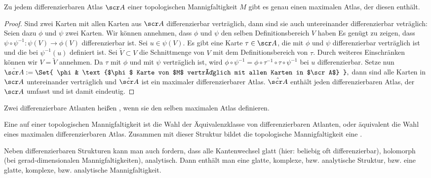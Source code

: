 \begin{st} \label{1.7}
    Zu jedem differenzierbaren Atlas $\scr A$ einer topologischen Mannigfaltigkeit $M$ gibt es genau einen maximalen Atlas, der diesen enthält.
    \begin{proof}
        Sind zwei Karten mit allen Karten aus $\scr A$ differenzierbar verträglich, dann sind sie auch untereinander differenzierbar veträglich:
        Seien dazu $\phi$ und $\psi$ zwei Karten.
        Wir können annehmen, dass $\phi$ und $\psi$ den selben Definitionsbereich $V$ haben
        Es genügt zu zeigen, dass
        \begin{math}
            \psi \circ \psi^{-1}: \psi(V) \to \phi(V)
        \end{math}
        differenzierbar ist.
        Sei $u \in \psi(V)$.
        Es gibt eine Karte $\tau \in \scr A$, die mit $\phi$ und $\psi$ differenzierbar verträglich ist und die bei $\psi^{-1}(u)$ definiert ist.
        Sei $\tilde V \subset V$ die Schnittmenge von $V$ mit dem Definitionsbereich von $\tau$.
        Durch weiteres Einschränken können wir $V = \tilde V$ annehmen.
        Da $\tau$ mit $\phi$ und mit $\psi$ verträglich ist, wird
        \begin{math}
            \phi \circ \psi^{-1} = \phi \circ \tau^{-1} \circ \tau \circ \psi^{-1}
        \end{math}
        bei $u$ differenzierbar.
        Setze nun
        \begin{math}
            \hat{\scr A} := \Set{ \phi & \text{$\phi$ Karte von $M$ verträglich mit allen Karten in $\scr A$} },
        \end{math}
        dann sind alle Karten in $\scr A$ untereinander verträglich und $\hat{\scr A}$ ist ein maximaler differenzierbarer Atlas.
        $\hat{\scr A}$ enthält jeden differenzierbaren Atlas, der $\scr A$ umfasst und ist damit eindeutig.
    \end{proof}
\end{st}

\begin{df*}
    Zwei differenzierbare Atlanten heißen , wenn sie den selben maximalen Atlas definieren.
\end{df*}

\begin{df} \label{1.8}
    Eine  auf einer topologischen Mannigfaltigkeit ist die Wahl der Äquivalenzklasse von differenzierbaren Atlanten, oder äquivalent die Wahl eines maximalen differenzierbaren Atlas.
    Zusammen mit dieser Struktur bildet die topologische Mannigfaltigkeit eine .
    \begin{note}
        Neben differenzierbaren Strukturen kann man auch fordern, dass alle Kantenwechsel glatt (hier: beliebig oft differenzierbar), holomorph (bei gerad-dimensionalen Mannigfaltigkeiten), analytisch.
        Dann enthält man eine glatte, komplexe, bzw. analytische Struktur, bzw. eine glatte, komplexe, bzw. analytische Mannigfaltigkeit.
    \end{note}
\end{df}

